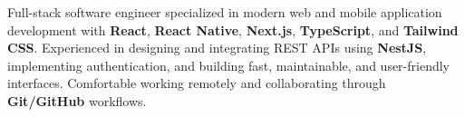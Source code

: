 \begin{cvparagraph}

    Full-stack software engineer specialized in modern web and mobile application development with \textbf{React}, \textbf{React Native}, \textbf{Next.js}, \textbf{TypeScript}, and \textbf{Tailwind CSS}. Experienced in designing and integrating REST APIs using \textbf{NestJS}, implementing authentication, and building fast, maintainable, and user-friendly interfaces. Comfortable working remotely and collaborating through \textbf{Git/GitHub} workflows.

\end{cvparagraph}
